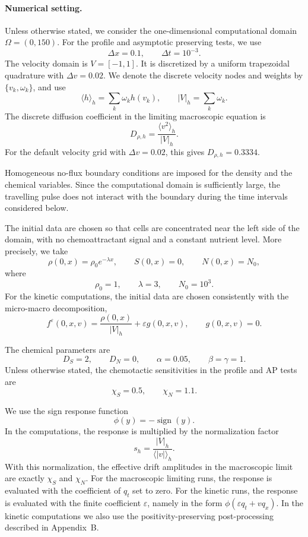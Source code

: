\documentclass[11pt,twoside]{article}
\numberwithin{equation}{section}
\theoremstyle{plain}
\theoremstyle{nonumberplain}
\begin{document}
{\paragraph{Numerical setting.}
Unless otherwise stated, we consider the one-dimensional computational
domain \(\Omega=(0,150)\). For the profile and asymptotic preserving
tests, we use
\[
\Delta x=0.1,
\qquad
\Delta t=10^{-3}.
\]
The velocity domain is \(V=[-1,1]\). It is discretized by a uniform
trapezoidal quadrature with \(\Delta v=0.02\). We denote the discrete
velocity nodes and weights by \(\{v_k,\omega_k\}\), and use
\[
\langle h\rangle_h=\sum_k\omega_k h(v_k),
\qquad
|V|_h=\sum_k\omega_k .
\]
The discrete diffusion coefficient in the limiting macroscopic equation
is
\[
D_{\rho,h}
=
\frac{\langle v^2\rangle_h}{|V|_h}.
\]
For the default velocity grid with \(\Delta v=0.02\), this gives
\(D_{\rho,h}=0.3334\).

Homogeneous no-flux boundary conditions are imposed for the density and
the chemical variables. Since the computational domain is sufficiently
large, the travelling pulse does not interact with the boundary during
the time intervals considered below.

The initial data are chosen so that cells are concentrated near the left
side of the domain, with no chemoattractant signal and a constant
nutrient level. More precisely, we take
\[
\rho(0,x)=\rho_0 e^{-\lambda x},
\qquad
S(0,x)=0,
\qquad
N(0,x)=N_0,
\]
where
\[
\rho_0=1,
\qquad
\lambda=3,
\qquad
N_0=10^3 .
\]
For the kinetic computations, the initial data are chosen consistently
with the micro-macro decomposition,
\[
f^\varepsilon(0,x,v)
=
\frac{\rho(0,x)}{|V|_h}
+
\varepsilon g(0,x,v),
\qquad
g(0,x,v)=0 .
\]

The chemical parameters are
\[
D_S=2,
\qquad
D_N=0,
\qquad
\alpha=0.05,
\qquad
\beta=\gamma=1 .
\]
Unless otherwise stated, the chemotactic sensitivities in the profile
and AP tests are
\[
\chi_S=0.5,
\qquad
\chi_N=1.1 .
\]

We use the sign response function
\[
\phi(y)=-\operatorname{sign}(y).
\]
In the computations, the response is multiplied by the normalization
factor
\[
s_h=\frac{|V|_h}{\langle |v|\rangle_h}.
\]
With this normalization, the effective drift amplitudes in the
macroscopic limit are exactly \(\chi_S\) and \(\chi_N\). For the
macroscopic limiting runs, the response is evaluated with the
coefficient of \(q_t\) set to zero. For the kinetic runs, the response is
evaluated with the finite coefficient \(\varepsilon\), namely in the form
\(\phi(\varepsilon q_t+vq_x)\). In the kinetic computations we also use
the positivity-preserving post-processing described in Appendix~B.

}
\end{document}
